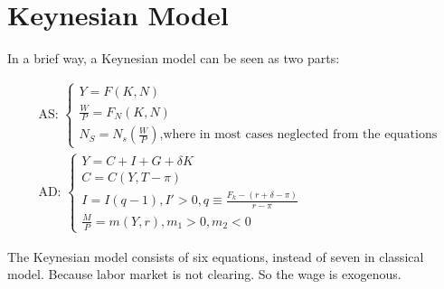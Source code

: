 \newpage
\section{Keynesian Model}
In a brief way, a Keynesian model can be seen as two parts:

\begin{align}
&
\text{AS: }
\begin{cases}
Y=F(K,N) \\
\frac{W}{P}=F_{N}(K,N) \\
N_{S}=N_{s}\left(\frac{W}{P}\right)\text{,where in most cases neglected from the equations}
\end{cases}
\\&\text{AD: }
\begin{cases}
Y=C+I+G+\delta K \\
C=C(Y,T-\pi) \\
I=I(q-1), I'>0, q\equiv \frac{F_{k}-(r+\delta-\pi)}{r-\pi} \\
\frac{M}{P}=m(Y,r),m_{1}>0,m_{2}<0
\end{cases}
\end{align}


The Keynesian model consists of six equations, instead of seven in
classical model. Because labor market is not clearing. So the wage is exogenous.




\newpage

